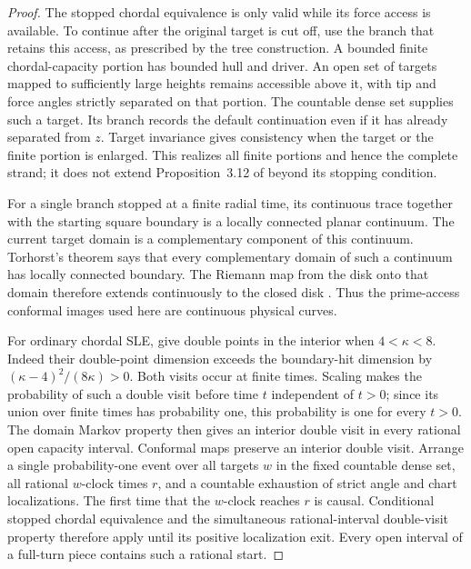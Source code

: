 \begin{proof}
The stopped chordal equivalence is only valid while its force access
is available.  To continue after the original target is cut off, use
the branch that retains this access, as prescribed by the tree
construction.  A bounded finite chordal-capacity portion has bounded
hull and driver.  An open set of targets mapped to sufficiently large
heights remains accessible above it, with tip and force angles strictly
separated on that portion.  The countable dense set supplies such a
target.  Its branch records the default continuation even if it has
already separated from $z$.  Target invariance gives consistency when
the target or the finite portion is enlarged.  This realizes all
finite portions and hence the complete strand; it does not extend
Proposition~3.12 of \citet{Sheffield2009Exploration} beyond its stopping
condition.

For a single branch stopped at a finite radial time, its continuous
trace together with the starting square boundary is a locally connected
planar continuum.  The current target domain is a complementary
component of this continuum.  Torhorst's theorem says that every
complementary domain of such a continuum has locally connected boundary.
The Riemann map from the disk onto that domain therefore extends
continuously to the closed disk
\citep[historical comments and Corollary~3.2]{RempeGillen2008PrimeEnds}.
Thus the prime-access conformal images used here are continuous
physical curves.

For ordinary chordal SLE, \citet[Theorem~1.1 and Corollary~1.7]{MillerWu2017}
give double points in the interior when $4<\kappa<8$.  Indeed their
double-point dimension exceeds the boundary-hit dimension by
$(\kappa-4)^2/(8\kappa)>0$.  Both visits occur at finite times.
Scaling makes the probability of such a double visit before time $t$
independent of $t>0$; since its union over finite times has probability
one, this probability is one for every $t>0$.  The domain Markov
property then gives an interior double visit in every rational open
capacity interval.  Conformal maps preserve an interior double visit.
Arrange a single probability-one event over all targets $w$ in the
fixed countable dense set, all rational $w$-clock times $r$, and a
countable exhaustion of strict angle and chart localizations.  The
first time that the $w$-clock reaches $r$ is causal.  Conditional
stopped chordal equivalence and the simultaneous rational-interval
double-visit property therefore apply until its positive localization
exit.  Every open interval of a full-turn piece contains such a
rational start.


\end{proof}
